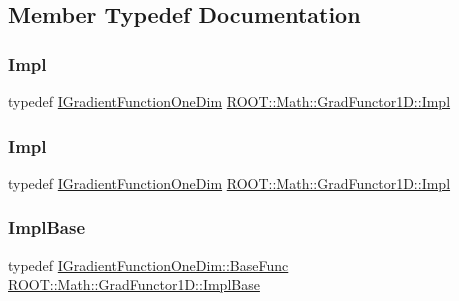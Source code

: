 \subsection{Member Typedef Documentation}
\mbox{\label{classROOT_1_1Math_1_1GradFunctor1D_a76566ff5310b5900b8df38e0884b3210}} 
\subsubsection{\texorpdfstring{Impl}{Impl}\hspace{0.1cm}{\footnotesize\ttfamily [1/2]}}
{\footnotesize\ttfamily typedef \mbox{\hyperlink{classROOT_1_1Math_1_1IGradientFunctionOneDim}{I\+Gradient\+Function\+One\+Dim}} \mbox{\hyperlink{classROOT_1_1Math_1_1GradFunctor1D_a76566ff5310b5900b8df38e0884b3210}{R\+O\+O\+T\+::\+Math\+::\+Grad\+Functor1\+D\+::\+Impl}}}

\mbox{\label{classROOT_1_1Math_1_1GradFunctor1D_a76566ff5310b5900b8df38e0884b3210}} 
\subsubsection{\texorpdfstring{Impl}{Impl}\hspace{0.1cm}{\footnotesize\ttfamily [2/2]}}
{\footnotesize\ttfamily typedef \mbox{\hyperlink{classROOT_1_1Math_1_1IGradientFunctionOneDim}{I\+Gradient\+Function\+One\+Dim}} \mbox{\hyperlink{classROOT_1_1Math_1_1GradFunctor1D_a76566ff5310b5900b8df38e0884b3210}{R\+O\+O\+T\+::\+Math\+::\+Grad\+Functor1\+D\+::\+Impl}}}

\mbox{\label{classROOT_1_1Math_1_1GradFunctor1D_a16b436a0d100aa6c16ee66961c4f5b97}} 
\subsubsection{\texorpdfstring{ImplBase}{ImplBase}\hspace{0.1cm}{\footnotesize\ttfamily [1/2]}}
{\footnotesize\ttfamily typedef \mbox{\hyperlink{classROOT_1_1Math_1_1IGradientFunctionOneDim_a9eae6bcbeb2d0396937710bd70bd29d0}{I\+Gradient\+Function\+One\+Dim\+::\+Base\+Func}} \mbox{\hyperlink{classROOT_1_1Math_1_1GradFunctor1D_a16b436a0d100aa6c16ee66961c4f5b97}{R\+O\+O\+T\+::\+Math\+::\+Grad\+Functor1\+D\+::\+Impl\+Base}}}

